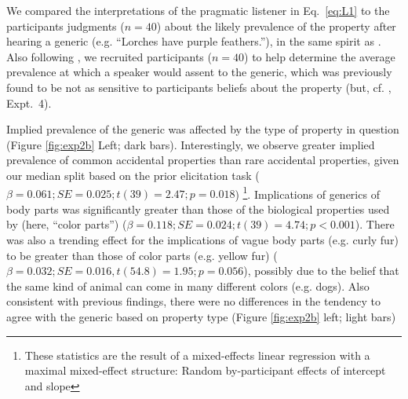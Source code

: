 \documentclass[10pt,letterpaper]{article}
\begin{document}
We compared the interpretations of the pragmatic listener in Eq.~\ref{eq:L1} to the participants judgments ($n=40$) about the likely prevalence of the property after hearing a generic (e.g. ``Lorches have purple feathers.''), in the same spirit as . Also following , we recruited participants ($n=40$) to help determine the average prevalence at which a speaker would assent to the generic, which was previously found to be not as sensitive to participants beliefs about the property (but, cf. , Expt.~4).

Implied prevalence of the generic was affected by the type of property in question (Figure \ref{fig:exp2b} Left; dark bars). 
Interestingly, we observe greater implied prevalence of common accidental properties than rare accidental properties, given our median split based on the prior elicitation task ($\beta=0.061; SE = 0.025; t(39) = 2.47; p = 0.018$) \footnote{These statistics are the result of a mixed-effects linear regression with a maximal mixed-effect structure: Random by-participant effects of intercept and slope}.
Implications of generics of body parts was significantly greater than those of the biological properties used by  (here, ``color parts'') ($\beta=0.118; SE = 0.024; t(39) = 4.74; p < 0.001$).
There was also a trending effect for the implications of vague body parts (e.g. curly fur) to be greater than those of color parts (e.g. yellow fur) ($\beta=0.032; SE = 0.016, t(54.8) = 1.95; p = 0.056$), possibly due to the belief that the same kind of animal can come in many different colors (e.g. dogs).
Also consistent with previous findings, there were no differences in the tendency to agree with the generic based on property type (Figure \ref{fig:exp2b} left; light bars)
\end{document}
